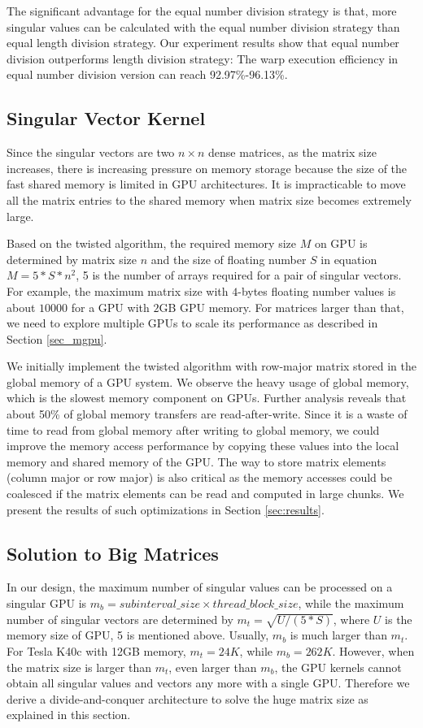 The significant advantage for the equal number division strategy is that, more singular values can be calculated with the equal number division strategy than equal length division strategy.
Our experiment results show that equal number division outperforms length division strategy:
The warp execution efficiency in equal number division version can reach 92.97\%-96.13\%.

\subsection{Singular Vector Kernel} \label{sec_svector}
Since the singular vectors are two $n\times n$ dense matrices, as the matrix size increases, there is increasing pressure on memory storage because the size of the fast shared memory is limited in GPU architectures.
It is impracticable to move all the matrix entries to the shared memory when matrix size becomes extremely large.

Based on the twisted algorithm, the required memory size $M$ on GPU is determined by matrix size $n$ and the size of floating number $S$ in equation $M = 5 * S * n^2$, 5 is the number of arrays required for a pair of singular vectors.
For example, the maximum matrix size with $4$-bytes floating number values is about $10000$ for a GPU with $2$GB GPU memory. 
For matrices larger than that, we need to explore multiple GPUs to scale its performance as described in Section \ref{sec_mgpu}.

We initially implement the twisted algorithm with row-major matrix stored in the global memory
of a GPU system. 
We observe the heavy usage of global memory, which is
the slowest memory component on GPUs. 
Further analysis reveals that about 50\% of global memory transfers are read-after-write. Since it is a waste of time to read from global memory after writing to global memory,
we could improve the memory access performance by copying these values into the local memory and shared memory of the GPU.
The way to store matrix elements (column major or row major) is also critical as the memory accesses could be coalesced if the matrix elements
can be read and computed in large chunks. We present the results
of such optimizations in Section \ref{sec:results}.

\subsection{Solution to Big Matrices} \label{sec_huge}
In our design, the maximum number of singular values can be processed on a singular GPU is $m_b = subinterval\_size \times thread\_block\_size$,
while the maximum number of singular vectors are determined by $m_t = \sqrt{U / (5 * S)}$,
where $U$ is the memory size of GPU, 5 is mentioned above.
Usually, $m_b$ is much larger than $m_t$.
For Tesla K40c with 12GB memory, $m_t = 24K$, while $m_b = 262K$.
However, when the matrix size is larger than $m_t$, even larger than $m_b$,
the GPU kernels cannot obtain all singular values and vectors any more with a single GPU.
Therefore we derive a divide-and-conquer architecture to solve the huge matrix size as explained in this section.

